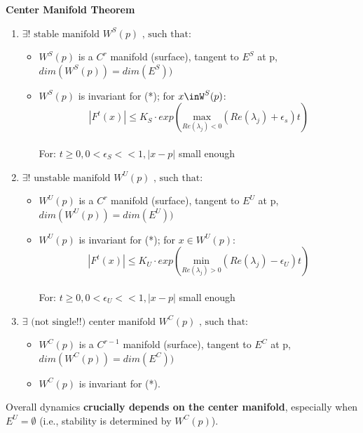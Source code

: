 \begin{tcolorbox}
\begin{theorem}
\textbf{Center Manifold Theorem}
\begin{enumerate}
    \item $\exists ! \text { stable manifold } W^S(p) \text{ , such that:}$
    \begin{itemize}
        \item $W^S(p)$ is a $C^r$ manifold (surface), tangent to $E^S$ at p, $dim(W^S(p))=dim(E^S))$
        \item $W^S(p)$ is invariant for (*); for $x\inW^S(p)$:
        $$|F^t(x)|\leq K_S\cdot exp(\underset{Re(\lambda_j)<0}{\mathrm{max}}(Re(\lambda_j)+\epsilon_s)t)$$\\ For: $t \geq 0, 0<\epsilon_S<<1, |x-p|$ small enough
    \end{itemize}
    \item $\exists ! \text { unstable manifold } W^U(p) \text{ , such that:}$
    \begin{itemize}
        \item $W^U(p)$ is a $C^r$ manifold (surface), tangent to $E^U$ at p, $dim(W^U(p))=dim(E^U))$
        \item $W^U(p)$ is invariant for (*); for $x\in W^U(p)$:
        $$|F^t(x)|\leq K_U\cdot exp(\underset{Re(\lambda_j)>0}{\mathrm{min}}(Re(\lambda_j)-\epsilon_U)t)$$\\ For: $t \geq 0, 0<\epsilon_U<<1, |x-p|$ small enough
    \end{itemize}
    \item $\exists \text { (not single!!) center manifold } W^C(p) \text{ , such that:}$
    \begin{itemize}
        \item $W^C(p)$ is a $C^{r-1}$ manifold (surface), tangent to $E^C$ at p, $dim(W^C(p))=dim(E^C))$
        \item $W^C(p)$ is invariant for (*).
    \end{itemize}
\end{enumerate}
\end{theorem}
\end{tcolorbox}

Overall dynamics \textbf{crucially depends on the center manifold}, especially when $E^U=\emptyset$ (i.e., stability is determined by $W^C(p)$).



